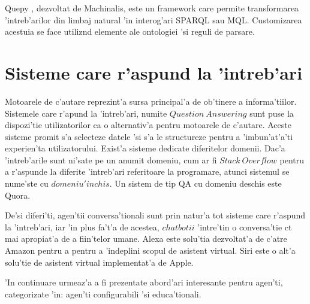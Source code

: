 \documentclass[12pt,a4paper,twoside]{report}
\begin{document}
Quepy \cite{quepyCite}, dezvoltat de Machinalis, este un framework care permite transformarea 'intreb'arilor din limbaj natural 'in interog'ari SPARQL sau MQL. Customizarea acestuia se face utiliz\ia nd elemente ale ontologiei 'si reguli de parsare.


\section{Sisteme care r'aspund la 'intreb'ari}

Motoarele de c'autare reprezint'a sursa principal'a de ob'tinere a informa'tiilor. Sistemele care r'apund la 'intreb'ari, numite $Question\ Answering$ sunt puse la dispozi'tie utilizatorilor ca o alternativ'a pentru motoarele de c'autare. Aceste sisteme promit s'a selecteze datele 'si s'a le structureze pentru a 'imbun'at'a'ti experien'ta utilizatorului. Exist'a sisteme dedicate diferitelor domenii. Dac'a 'intreb'arile sunt ni'sate pe un anumit domeniu, cum ar fi $Stack\ Overflow$ pentru a r'aspunde la diferite 'intreb'ari referitoare la programare, atunci sistemul se nume'ste cu $domeniu 'inchis$. Un sistem de tip QA cu domeniu deschis este Quora.

De'si diferi'ti, agen'tii conversa'tionali sunt prin natur'a tot sisteme care r'aspund la 'intreb'ari, iar 'in plus fa't'a de acestea, $chatbotii$ 'intre'tin o conversa'tie c\ia t mai apropiat'a de a fiin'telor umane. Alexa este solu'tia dezvoltat'a de c'atre Amazon pentru a pentru a 'indeplini scopul de asistent virtual. Siri este o alt'a solu'tie de asistent virtual implementat'a de Apple.

'In continuare urmeaz'a a fi prezentate abord'ari interesante pentru agen'ti, categorizate 'in: agen'ti configurabili 'si educa'tionali. 




\end{document}
